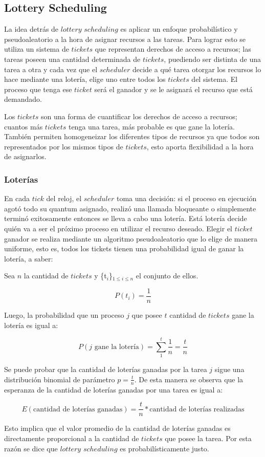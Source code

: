 \subsection{Lottery Scheduling}

La idea detr\'as de $lottery$ $scheduling$\cite{SchedLottery} es aplicar un enfoque probabil\'istico y pseudoaleatorio a la hora de asignar recursos a las tareas. Para lograr esto se utiliza un sistema de $tickets$ que representan derechos de acceso a recursos; las tareas poseen una cantidad determinada de $tickets$, puediendo ser distinta de una tarea a otra y cada vez que el $scheduler$ decide a qu\'e tarea otorgar los recursos lo hace mediante una loter\'ia, elige uno entre todos los $tickets$ del sistema. El proceso que tenga ese $ticket$ ser\'a el ganador y se le asignar\'a el recurso que est\'a demandado.

Los $tickets$ son una forma de cuantificar los derechos de acceso a recursos; cuantos m\'as $tickets$ tenga una tarea, m\'as probable es que gane la loter\'ia. Tambi\'en permiten homogeneizar los diferentes tipos de recursos ya que todos son representados por los mismos tipos de $tickets$, esto aporta flexibilidad a la hora de asignarlos.

\subsubsection{Loter\'ias}

En cada $tick$ del reloj, el $scheduler$ toma una decisi\'on: si el proceso en ejecuci\'on agot\'o todo su quantum asignado, realiz\'o una llamada bloqueante o simplemente termin\'o exitosamente entonces se lleva a cabo una loter\'ia. Est\'a loter\'ia decide qui\'en va a ser el pr\'oximo proceso en utilizar el recurso deseado. Elegir el $ticket$ ganador se realiza mediante un algoritmo pseudoaleatorio que lo elige de manera uniforme, esto es, todos los tickets tienen una probabilidad igual de ganar la loter\'ia, a saber:

Sea $n$ la cantidad de $tickets$ y \{t$_i$\}$_{1 \leq i \leq n}$ el conjunto de ellos.

\[
	P(t_{i}) = \frac{1}{n}
\]

Luego, la probabilidad que un proceso $j$ que posee $t$ cantidad de $tickets$ gane la loter\'ia es igual a:


\[
	P(j \text{ gane la loter\'ia}) = \sum_{1}^{t}\frac{1}{n} = \frac{t}{n}
\]

Se puede probar que la cantidad de loter\'ias ganadas por la tarea $j$ sigue una distribuci\'on binomial de par\'ametro $p = \frac{t}{n}$. De esta manera se observa que la esperanza de la cantidad de loter\'ias ganadas por una tarea es igual a:

\[
	E(\text{cantidad de loter\'ias ganadas}) = \frac{t}{n}*\text{cantidad de loter\'ias realizadas}
\]

Esto implica que el valor promedio de la cantidad de loter\'ias ganadas es directamente proporcional a la cantidad de $tickets$ que posee la tarea. Por esta raz\'on se dice que $lottery$ $scheduling$ es probabil\'isticamente justo.